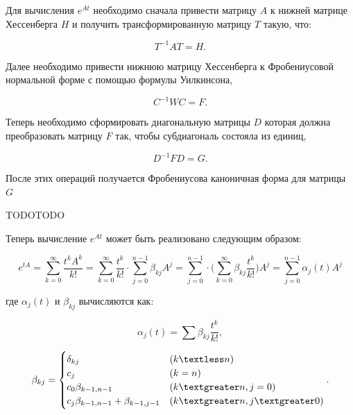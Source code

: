 \documentclass[master, och, diploma, times]{sty/SCWorks}
\theoremstyle{plain}
\theoremstyle{definition}
\begin{document}
Для вычисления $e^{At}$ необходимо сначала привести матрицу $A$ к нижней матрице Хессенберга $H$ и получить трансформированную матрицу $T$ такую, что:

\begin{equation}
T^{-1}AT=H.
\end{equation} 

Далее необходимо привести нижнюю матрицу Хессенберга к Фробениусовой нормальной форме с помощью формулы Уилкинсона,

\begin{equation}
C^{-1}WC=F.
\end{equation}

Теперь необходимо сформировать диагональную матрицы $D$ которая должна преобразовать матрицу $F$ так, чтобы субдиагональ состояла из единиц,

\begin{equation}
D^{-1}FD=G.
\end{equation}

После этих операций получается Фробениусова каноничная форма для матрицы $G$
 
 
 
TODOTODO

Теперь вычисление $e^{At}$ может быть реализовано следующим образом:


\begin{equation}
e^{tA}=\sum\limits_{k=0}^{\infty} \frac{t^kA^k}{k!}=\sum\limits_{k=0}^{\infty} \frac{t^k}{k!} \cdot \sum\limits_{j=0}^{n-1} \beta_{kj} A^j = \sum\limits_{j=0}^{n-1} \cdot \bigg(\sum\limits_{k=0}^{\infty} \beta_{kj} \frac{t^k}{k!} \bigg) A^j = \sum\limits_{j=0}^{n-1} \alpha_{j}(t)A^j
\end{equation}

\noindent где $\alpha_{j}(t)$ и $\beta_{kj}$ вычисляются как:

\begin{equation}
\alpha_{j}(t)=\sum \beta_{kj} \frac{t^k}{k!},
\end{equation}

\begin{equation}
\beta_{kj} = \begin{cases} 
\delta_{kj} & (k \textless n) \\
c_j & (k = n) \\
c_0 \beta_{k-1,n-1} & (k \textgreater n, j=0) \\
c_j \beta_{k-1,n-1}+\beta_{k-1,j-1} & (k \textgreater n, j \textgreater 0)
\end{cases}.
\end{equation}
\end{document}
